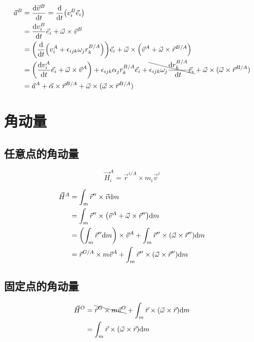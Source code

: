 \begin{equation}
  \begin{split}
    \vec{a}^B&=\frac{\mathrm{d}\vec{v}^B}{\mathrm{d}t}=\frac{\mathrm{d}}{\mathrm{d}t}\qty(v^B_i\vec{e}_i)\\
    &=\frac{\mathrm{d}v^B_i}{\mathrm{d}t}\vec{e}_i+\vec{\omega}\times\vec{v}^B\\
    &=\qty(\frac{\mathrm{d}}{\mathrm{d}t}\qty(v^A_i+\epsilon_{ijk}\omega_jr^{B/A}_k))\vec{e}_i+\vec{\omega}\times\qty(\vec{v}^A+\vec{\omega}\times\vec{r}^{B/A})\\
    &=\qty(\frac{\mathrm{d}v^A_i}{\mathrm{d}t}\vec{e}_i+\vec{\omega}\times\vec{v}^A)+\epsilon_{ijk}\alpha_jr^{B/A}_k\vec{e}_i+\bcancel{\epsilon_{ijk}\omega_j\frac{\mathrm{d}r^{B/A}_k}{\mathrm{d}t}\vec{e}_i}+\vec{\omega}\times(\vec{\omega}\times\vec{r}^{B/A})\\
    &=\vec{a}^A+\vec{\alpha}\times\vec{r}^{B/A}+\vec{\omega}\times(\vec{\omega}\times\vec{r}^{B/A})
  \end{split}
\end{equation}

\section{角动量}
\subsection{任意点的角动量}
\begin{equation}
  \vec{H}^A_i=\vec{r}^{i/A}\times m_i\vec{v}^i
\end{equation}

\begin{equation}
  \begin{split}
    \vec{H}^A&=\int_m\vec{r}''\times\vec{v}\mathrm{d}m\\
    &=\int_m\vec{r}''\times\qty(\vec{v}^A+\vec{\omega}\times\vec{r}'')\mathrm{d}m\\
    &=\qty(\int_m\vec{r}''\mathrm{d}m)\times\vec{v}^A+\int_m\vec{r}''\times(\vec{\omega}\times\vec{r}'')\mathrm{d}m\\
    &=\vec{r}^{G/A}\times m\vec{v}^A+\int_m\vec{r}''\times(\vec{\omega}\times\vec{r}'')\mathrm{d}m
  \end{split}
\end{equation}

\subsection{固定点的角动量}
\begin{equation}
  \begin{split}
    \vec{H}^O&=\bcancel{\vec{r}^{G}\times m\vec{v}^O}+\int_m\vec{r}\times(\vec{\omega}\times\vec{r})\mathrm{d}m\\
    &=\int_m\vec{r}\times(\vec{\omega}\times\vec{r})\mathrm{d}m
  \end{split}
\end{equation}
